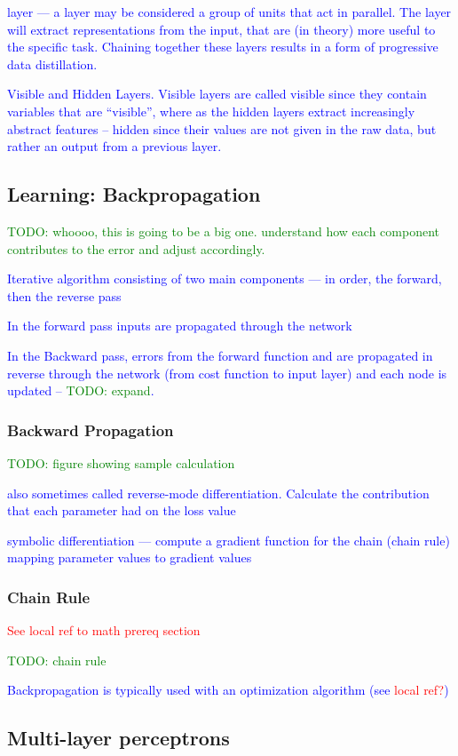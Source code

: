 \textcolor{blue}{layer --- a layer may be considered a group of units that act in parallel. The layer will extract representations from the input, that are (in theory) more useful to the specific task.  Chaining together these layers results in a form of progressive {data distillation}.}

\textcolor{blue}{Visible and Hidden Layers. Visible layers are called visible since they contain variables that are ``visible'', where as the hidden layers extract increasingly abstract features -- hidden since their values are not given in the raw data, but rather an output from a previous layer.}



\subsection{Learning: Backpropagation}

\textcolor{green}{TODO: whoooo, this is going to be a big one. understand how each component contributes to the error and adjust accordingly.}

\textcolor{blue}{Iterative algorithm consisting of two main components --- in order, the forward, then the reverse pass}

\textcolor{blue}{In the forward pass inputs are propagated through the network}

\textcolor{blue}{In the Backward pass, errors from the forward function and  are propagated in reverse through the network (from cost function to input layer) and each node is updated -- \textcolor{green}{TODO: expand}.}

\subsubsection{Backward Propagation}


\textcolor{green}{TODO: figure showing sample calculation}



\textcolor{blue}{also sometimes called {reverse-mode differentiation}.  Calculate the contribution that each parameter had on the loss value}

\textcolor{blue}{{symbolic differentiation} --- compute a gradient function for the chain (chain rule) mapping parameter values to gradient values}

\subsubsection{Chain Rule}

\textcolor{red}{See \textcolor{red}{local ref to math prereq section}}

\textcolor{green}{TODO: chain rule}

\textcolor{blue}{Backpropagation is typically used with an optimization algorithm (see \textcolor{red}{local ref?})}

\subsection{Multi-layer perceptrons}